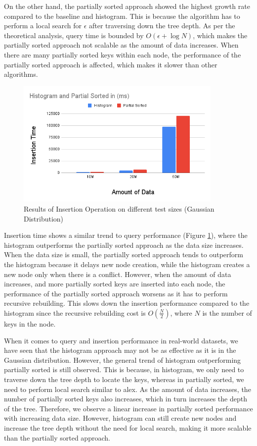 On the other hand, the partially sorted approach showed the highest growth rate compared to the baseline and histogram. This is because the algorithm has to perform a local search for $\epsilon$ after traversing down the tree depth. As per the theoretical analysis, query time is bounded by $O(\epsilon + \log N)$, which makes the partially sorted approach not scalable as the amount of data increases. When there are many partially sorted keys within each node, the performance of the partially sorted approach is affected, which makes it slower than other \learnindex algorithms.
\begin{figure}[H]
    \centering
    \includegraphics[width=100mm,scale=1]{Figures/InsertionScalability.png}
    \caption{
     Results of Insertion Operation on different test sizes (Gaussian Distribution)
    }
    \label{fig:InsertionScalability}
\end{figure}
Insertion time shows a similar trend to query performance (Figure \ref{fig:InsertionScalability}), where the histogram outperforms the partially sorted approach as the data size increases. When the data size is small, the partially sorted approach tends to outperform the histogram because it delays new node creation, while the histogram creates a new node only when there is a conflict. However, when the amount of data increases, and more partially sorted keys are inserted into each node, the performance of the partially sorted approach worsens as it has to perform recursive rebuilding. This slows down the insertion performance compared to the histogram since the recursive rebuilding cost is $O(\frac{N}{2})$, where $N$ is the number of keys in the node.

When it comes to query and insertion performance in real-world datasets, we have seen that the histogram approach may not be as effective as it is in the Gaussian distribution. However, the general trend of histogram outperforming partially sorted is still observed. This is because, in histogram, we only need to traverse down the tree depth to locate the keys, whereas in partially sorted, we need to perform local search similar to \acrshort{alex}\cite{ALEX}. As the amount of data increases, the number of partially sorted keys also increases, which in turn increases the depth of the tree. Therefore, we observe a linear increase in partially sorted performance with increasing data size. However, histogram can still create new nodes and increase the tree depth without the need for local search, making it more scalable than the partially sorted approach.

